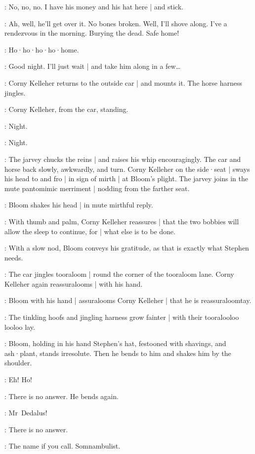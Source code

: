 \Bloom:
No,
no,
no.
I have his money and his hat here |
and stick.

\Corny:
Ah,
well,
he'll get over it.
No bones broken.
Well,
I'll shove along.
I've a rendezvous in the morning.
Burying the dead.
Safe home!

\Horse:
Ho·ho·ho·ho·home.

\Bloom:
Good night.
I'll just wait |
and take him along in a few…

:
Corny Kelleher returns to the outside car |
and mounts it.
The horse harness jingles.

:
Corny Kelleher,
from the car,
standing.

\Corny:
Night.

\Bloom:
Night.

:
The jarvey chucks the reins |
and raises his whip encouragingly.
The car and horse back slowly,
awkwardly,
and turn.
Corny Kelleher on the side·seat |
sways his head to and fro |
%
in sign of mirth |
at Bloom's plight.
The jarvey joins in the mute pantomimic merriment |
nodding from the farther seat.

:
Bloom shakes his head |
in mute mirthful reply.

:
With thumb and palm,
Corny Kelleher reassures |
that the two bobbies will allow the sleep to continue,
for |
what else is to be done.

:
With a slow nod,
Bloom conveys his gratitude,
as that is exactly what Stephen needs.

:
The car jingles tooraloom |
round the corner of the tooraloom lane.
Corny Kelleher again reassuralooms |
with his hand.

:
Bloom with his hand |
assuralooms Corny Kelleher |
that he is reassuraloomtay.

:
The tinkling hoofs and jingling harness grow fainter |
with their tooralooloo looloo lay.

:
Bloom,
holding in his hand Stephen's hat,
festooned with shavings,
and ash·plant,
stands irresolute.
Then he bends to him and shakes him by the shoulder.

\Bloom:
Eh!
Ho!

:
There is no answer.
He bends again.

\Bloom:
Mr~Dedalus!

:
There is no answer.

\Bloom:
The name if you call.
Somnambulist.

